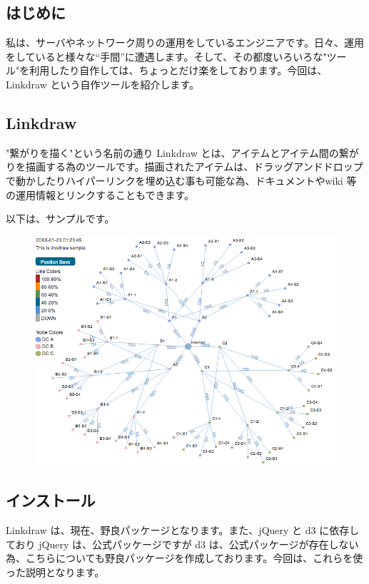 \documentclass[mingoth,a4paper,twoside]{jsarticle}
\begin{document}
\pagebreak

\subsection{はじめに}

私は、サーバやネットワーク周りの運用をしているエンジニアです。日々、運用をしていると様々な``手間''に遭遇します。そして、その都度いろいろな"ツール"を利用したり自作しては、ちょっとだけ楽をしております。今回は、Linkdraw という自作ツールを紹介します。

\subsection{Linkdraw}
"繋がりを描く"という名前の通り Linkdraw とは、アイテムとアイテム間の繋がりを描画する為のツールです。描画されたアイテムは、ドラッグアンドドロップで動かしたりハイパーリンクを埋め込む事も可能な為、ドキュメントやwiki 等の運用情報とリンクすることもできます。

以下は、サンプルです。

\begin{figure}[h!]
\centering
\includegraphics[width=0.8\hsize]{image2013-gum/mtoshilinkdraw2013061122150-img1.png}
\end{figure}
\pagebreak

\subsection{インストール}
Linkdraw は、現在、野良パッケージとなります。また、jQuery と d3 に依存しており jQuery は、公式パッケージですが d3 は、公式パッケージが存在しない為、こちらについても野良パッケージを作成しております。今回は、これらを使った説明となります。
\end{document}
